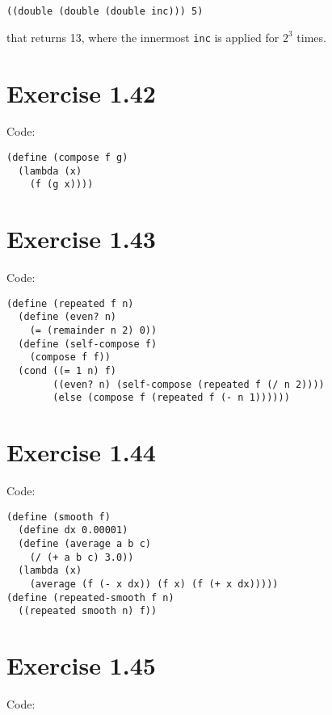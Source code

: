 \documentclass[../main.tex]{subfiles}
\begin{document}
\begin{lstlisting}
((double (double (double inc))) 5)
\end{lstlisting}

that returns 13, where the innermost \lstinline{inc} is
 applied for $2^3$ times.

\section{Exercise 1.42}

Code:

\begin{lstlisting}
(define (compose f g)
  (lambda (x)
    (f (g x))))
\end{lstlisting}

\section{Exercise 1.43}

Code:

\begin{lstlisting}
(define (repeated f n)
  (define (even? n)
    (= (remainder n 2) 0))
  (define (self-compose f)
    (compose f f))
  (cond ((= 1 n) f)
        ((even? n) (self-compose (repeated f (/ n 2))))
        (else (compose f (repeated f (- n 1))))))
\end{lstlisting}

\section{Exercise 1.44}

Code:

\begin{lstlisting}
(define (smooth f)
  (define dx 0.00001)
  (define (average a b c)
    (/ (+ a b c) 3.0))
  (lambda (x)
    (average (f (- x dx)) (f x) (f (+ x dx)))))
(define (repeated-smooth f n)
  ((repeated smooth n) f))
\end{lstlisting}

\section{Exercise 1.45}

Code:
\end{document}
